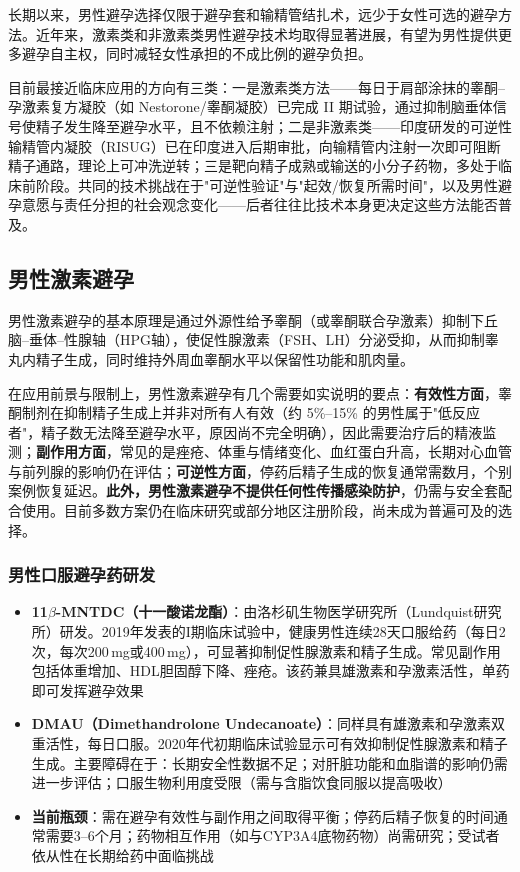 \documentclass[12pt,a4paper,twoside]{ctexbook}
\begin{document}
长期以来，男性避孕选择仅限于避孕套和输精管结扎术，远少于女性可选的避孕方法。近年来，激素类和非激素类男性避孕技术均取得显著进展，有望为男性提供更多避孕自主权，同时减轻女性承担的不成比例的避孕负担。


目前最接近临床应用的方向有三类：一是激素类方法——每日于肩部涂抹的睾酮--孕激素复方凝胶（如 Nestorone/睾酮凝胶）已完成 II 期试验，通过抑制脑垂体信号使精子发生降至避孕水平，且不依赖注射；二是非激素类——印度研发的可逆性输精管内凝胶（RISUG）已在印度进入后期审批，向输精管内注射一次即可阻断精子通路，理论上可冲洗逆转；三是靶向精子成熟或输送的小分子药物，多处于临床前阶段。共同的技术挑战在于"可逆性验证"与"起效/恢复所需时间"，以及男性避孕意愿与责任分担的社会观念变化——后者往往比技术本身更决定这些方法能否普及。

\subsection{男性激素避孕}

男性激素避孕的基本原理是通过外源性给予睾酮（或睾酮联合孕激素）抑制下丘脑--垂体--性腺轴（HPG轴），使促性腺激素（FSH、LH）分泌受抑，从而抑制睾丸内精子生成，同时维持外周血睾酮水平以保留性功能和肌肉量。


在应用前景与限制上，男性激素避孕有几个需要如实说明的要点：\textbf{有效性方面}，睾酮制剂在抑制精子生成上并非对所有人有效（约 5\%--15\% 的男性属于"低反应者"，精子数无法降至避孕水平，原因尚不完全明确），因此需要治疗后的精液监测；\textbf{副作用方面}，常见的是痤疮、体重与情绪变化、血红蛋白升高，长期对心血管与前列腺的影响仍在评估；\textbf{可逆性方面}，停药后精子生成的恢复通常需数月，个别案例恢复延迟。\textbf{此外，男性激素避孕不提供任何性传播感染防护}，仍需与安全套配合使用。目前多数方案仍在临床研究或部分地区注册阶段，尚未成为普遍可及的选择。

\subsubsection{男性口服避孕药研发}

\begin{itemize}[leftmargin=2cm]
	\item \textbf{11$\beta$-MNTDC（十一酸诺龙酯）}：由洛杉矶生物医学研究所（Lundquist研究所）研发。2019年发表的I期临床试验中，健康男性连续28天口服给药（每日2次，每次200\,mg或400\,mg），可显著抑制促性腺激素和精子生成。常见副作用包括体重增加、HDL胆固醇下降、痤疮。该药兼具雄激素和孕激素活性，单药即可发挥避孕效果
	\item \textbf{DMAU（Dimethandrolone Undecanoate）}：同样具有雄激素和孕激素双重活性，每日口服。2020年代初期临床试验显示可有效抑制促性腺激素和精子生成。主要障碍在于：长期安全性数据不足；对肝脏功能和血脂谱的影响仍需进一步评估；口服生物利用度受限（需与含脂饮食同服以提高吸收）
	\item \textbf{当前瓶颈}：需在避孕有效性与副作用之间取得平衡；停药后精子恢复的时间通常需要3--6个月；药物相互作用（如与CYP3A4底物药物）尚需研究；受试者依从性在长期给药中面临挑战
\end{itemize}
\end{document}

